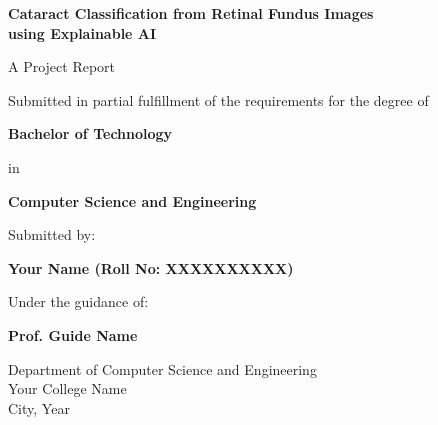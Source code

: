 \documentclass[12pt, a4paper]{article}
\begin{document}
\begin{titlepage}
\centering
\vspace*{2cm}

{\LARGE\bfseries Cataract Classification from Retinal Fundus Images\\using Explainable AI\par}

\vspace{1.5cm}

{\large A Project Report\par}
\vspace{0.5cm}
{\large Submitted in partial fulfillment of the requirements for the degree of\par}
\vspace{0.5cm}
{\large\bfseries Bachelor of Technology\par}
\vspace{0.3cm}
{\large in\par}
\vspace{0.3cm}
{\large\bfseries Computer Science and Engineering\par}

\vspace{2cm}

{\large Submitted by:\par}
\vspace{0.3cm}
{\large\bfseries Your Name (Roll No: XXXXXXXXXX)\par}

\vspace{1.5cm}

{\large Under the guidance of:\par}
\vspace{0.3cm}
{\large\bfseries Prof. Guide Name\par}

\vspace{2cm}

{\large Department of Computer Science and Engineering\\
Your College Name\\
City, Year\par}

\end{titlepage}

\newpage
\tableofcontents
\newpage

\end{document}
